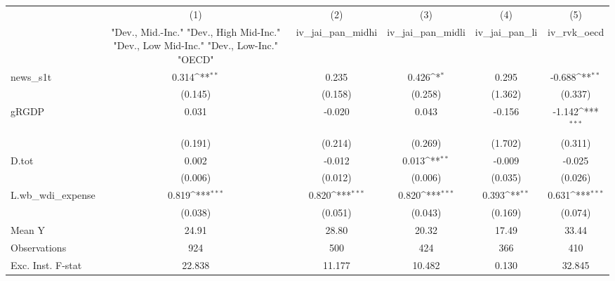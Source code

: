 {
\def\sym#1{\ifmmode^{#1}\else\(^{#1}\)\fi}
\begin{tabular}{l*{5}{c}}
\toprule
            &\multicolumn{1}{c}{(1)}&\multicolumn{1}{c}{(2)}&\multicolumn{1}{c}{(3)}&\multicolumn{1}{c}{(4)}&\multicolumn{1}{c}{(5)}\\
            &\multicolumn{1}{c}{ "Dev., Mid.-Inc." "Dev., High Mid-Inc." "Dev., Low Mid-Inc." "Dev., Low-Inc." "OECD" }&\multicolumn{1}{c}{iv\_jai\_pan\_midhi}&\multicolumn{1}{c}{iv\_jai\_pan\_midli}&\multicolumn{1}{c}{iv\_jai\_pan\_li}&\multicolumn{1}{c}{iv\_rvk\_oecd}\\
\midrule
news\_s1t    &       0.314\sym{**} &       0.235         &       0.426\sym{*}  &       0.295         &      -0.688\sym{**} \\
            &     (0.145)         &     (0.158)         &     (0.258)         &     (1.362)         &     (0.337)         \\
\addlinespace
gRGDP       &       0.031         &      -0.020         &       0.043         &      -0.156         &      -1.142\sym{***}\\
            &     (0.191)         &     (0.214)         &     (0.269)         &     (1.702)         &     (0.311)         \\
\addlinespace
D.tot       &       0.002         &      -0.012         &       0.013\sym{**} &      -0.009         &      -0.025         \\
            &     (0.006)         &     (0.012)         &     (0.006)         &     (0.035)         &     (0.026)         \\
\addlinespace
L.wb\_wdi\_expense&       0.819\sym{***}&       0.820\sym{***}&       0.820\sym{***}&       0.393\sym{**} &       0.631\sym{***}\\
            &     (0.038)         &     (0.051)         &     (0.043)         &     (0.169)         &     (0.074)         \\
\midrule
Mean Y      &       24.91         &       28.80         &       20.32         &       17.49         &       33.44         \\
Observations&         924         &         500         &         424         &         366         &         410         \\
Exc. Inst. F-stat&      22.838         &      11.177         &      10.482         &       0.130         &      32.845         \\
\bottomrule
\end{tabular}
}
